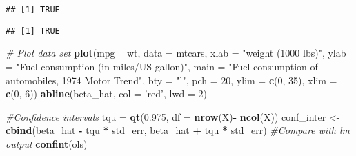 \documentclass[]{book}
\newenvironment{Shaded}{\begin{snugshade}}{\end{snugshade}}
\newcommand{\CommentTok}[1]{\textcolor[rgb]{0.56,0.35,0.01}{\textit{#1}}}
\newcommand{\ControlFlowTok}[1]{\textcolor[rgb]{0.13,0.29,0.53}{\textbf{#1}}}
\newcommand{\DataTypeTok}[1]{\textcolor[rgb]{0.13,0.29,0.53}{#1}}
\newcommand{\DecValTok}[1]{\textcolor[rgb]{0.00,0.00,0.81}{#1}}
\newcommand{\FloatTok}[1]{\textcolor[rgb]{0.00,0.00,0.81}{#1}}
\newcommand{\KeywordTok}[1]{\textcolor[rgb]{0.13,0.29,0.53}{\textbf{#1}}}
\newcommand{\NormalTok}[1]{#1}
\newcommand{\OperatorTok}[1]{\textcolor[rgb]{0.81,0.36,0.00}{\textbf{#1}}}
\newcommand{\StringTok}[1]{\textcolor[rgb]{0.31,0.60,0.02}{#1}}
\theoremstyle{definition}
\theoremstyle{definition}
\theoremstyle{definition}
\theoremstyle{remark}
\begin{document}
\begin{verbatim}
## [1] TRUE
\end{verbatim}

\begin{Shaded}
\end{Shaded}

\begin{verbatim}
## [1] TRUE
\end{verbatim}

\begin{Shaded}
\begin{Highlighting}[]
\CommentTok{# Plot data set}
\KeywordTok{plot}\NormalTok{(mpg }\OperatorTok{~}\StringTok{ }\NormalTok{wt, }\DataTypeTok{data =}\NormalTok{ mtcars, }
     \DataTypeTok{xlab =} \StringTok{"weight (1000 lbs)"}\NormalTok{, }
     \DataTypeTok{ylab =} \StringTok{"Fuel consumption (in miles/US gallon)"}\NormalTok{, }
     \DataTypeTok{main =} \StringTok{"Fuel consumption of automobiles, 1974 Motor Trend"}\NormalTok{, }
     \DataTypeTok{bty =} \StringTok{"l"}\NormalTok{, }\DataTypeTok{pch =} \DecValTok{20}\NormalTok{, }\DataTypeTok{ylim =} \KeywordTok{c}\NormalTok{(}\DecValTok{0}\NormalTok{, }\DecValTok{35}\NormalTok{), }\DataTypeTok{xlim =} \KeywordTok{c}\NormalTok{(}\DecValTok{0}\NormalTok{, }\DecValTok{6}\NormalTok{))}
\KeywordTok{abline}\NormalTok{(beta_hat, }\DataTypeTok{col =} \StringTok{'red'}\NormalTok{, }\DataTypeTok{lwd =} \DecValTok{2}\NormalTok{)}

\CommentTok{#Confidence intervals}
\NormalTok{tqu =}\StringTok{ }\KeywordTok{qt}\NormalTok{(}\FloatTok{0.975}\NormalTok{, }\DataTypeTok{df =} \KeywordTok{nrow}\NormalTok{(X)}\OperatorTok{-}\StringTok{ }\KeywordTok{ncol}\NormalTok{(X))}
\NormalTok{conf_inter <-}\StringTok{ }\KeywordTok{cbind}\NormalTok{(beta_hat }\OperatorTok{-}\StringTok{ }\NormalTok{tqu }\OperatorTok{*}\StringTok{ }\NormalTok{std_err, beta_hat }\OperatorTok{+}\StringTok{ }\NormalTok{tqu }\OperatorTok{*}\StringTok{ }\NormalTok{std_err)}
\CommentTok{#Compare with lm output}
\KeywordTok{confint}\NormalTok{(ols)}
\end{Highlighting}
\end{Shaded}
\end{document}
